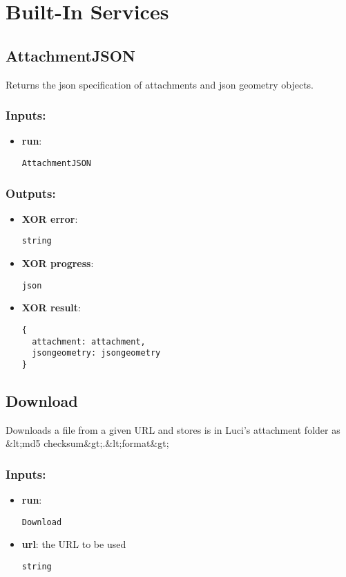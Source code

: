 \section{Built-In Services}
\label{ch:builtinservices}

\subsection{AttachmentJSON}
\label{ch:builtinservices:AttachmentJSON}
Returns the json specification of attachments and json geometry objects.
\subsubsection*{Inputs:}
\begin{itemize}
    \item \textbf{run}: 
\begin{lstlisting}
AttachmentJSON
\end{lstlisting}
  \end{itemize}

\subsubsection*{Outputs:}
\begin{itemize}
    \item \textbf{XOR error}: 
\begin{lstlisting}
string
\end{lstlisting}
    \item \textbf{XOR progress}: 
\begin{lstlisting}
json
\end{lstlisting}
    \item \textbf{XOR result}: 
\begin{lstlisting}
{
  attachment: attachment, 
  jsongeometry: jsongeometry
}
\end{lstlisting}
  \end{itemize}

\subsection{Download}
\label{ch:builtinservices:Download}
Downloads
 a file from a given URL and stores is in Luci's attachment folder as 
\&lt;md5 checksum\&gt;.\&lt;format\&gt; 
\subsubsection*{Inputs:}
\begin{itemize}
    \item \textbf{run}: 
\begin{lstlisting}
Download
\end{lstlisting}
    \item \textbf{url}: the URL to be used
\begin{lstlisting}
string
\end{lstlisting}
  \end{itemize}

